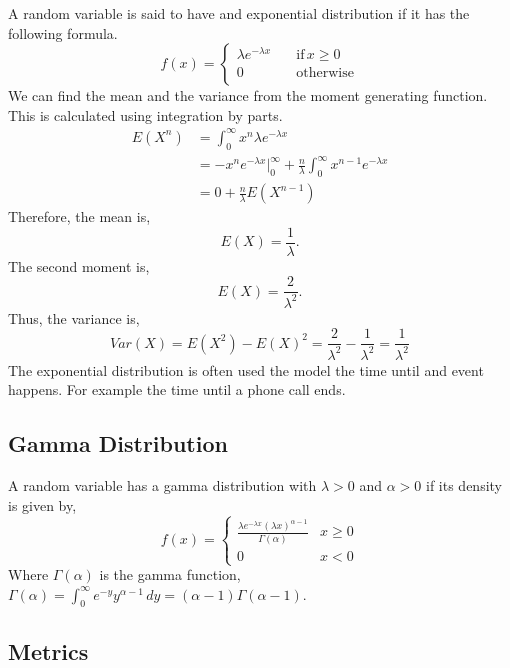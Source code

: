 \documentclass{article}
\begin{document}
A random variable is said to have and exponential distribution if it has the following formula.
$$
    f(x) = 
    \begin{cases}
        \lambda e ^ {-\lambda x} \quad & \text{if} \, x \geq 0 \\
        0 \quad & \text{otherwise} \\
    \end{cases}
$$
We can find the mean and the variance from the moment generating function. This is calculated using integration by parts.
\begin{align}
    E(X^n) & = \int_{0}^{\infty} x^n \lambda e^{-\lambda x} \\
           & = - x^n e^{-\lambda x} \Bigr|^\infty_0 + \frac{n}{\lambda}\int_{0}^{\infty} x^{n - 1} e^{-\lambda x} \\
           & = 0 + \frac{n}{\lambda} E(X^{n - 1})
\end{align}
Therefore, the mean is,
\begin{equation}
    E(X) = \frac{1}{\lambda}.
\end{equation}
The second moment is,
\begin{equation}
    E(X) = \frac{2}{\lambda^2}.
\end{equation}
Thus, the variance is,
\begin{equation}
    Var(X) = E(X^2) - E(X)^2 = \frac{2}{\lambda^2} - \frac{1}{\lambda^2} = \frac{1}{\lambda^2}
\end{equation}
The exponential distribution is often used the model the time until and event happens. For example the time until a phone call ends.

\subsection{Gamma Distribution}

A random variable has a gamma distribution with $\lambda > 0$ and $\alpha > 0$ if its density is given by,
\begin{equation}
    f(x) =
    \begin{cases}
        \frac{\lambda e^{-\lambda x} (\lambda x)^{\alpha - 1}}{\Gamma(\alpha)} & x \geq 0 \\
        0 & x < 0
    \end{cases}
\end{equation}
Where $\Gamma(\alpha)$ is the gamma function, $\Gamma(\alpha) = \int_0^\infty e^{-y} y^{\alpha - 1} \, dy = (\alpha - 1)\Gamma(\alpha - 1)$.

\subsection{Metrics}
\end{document}
